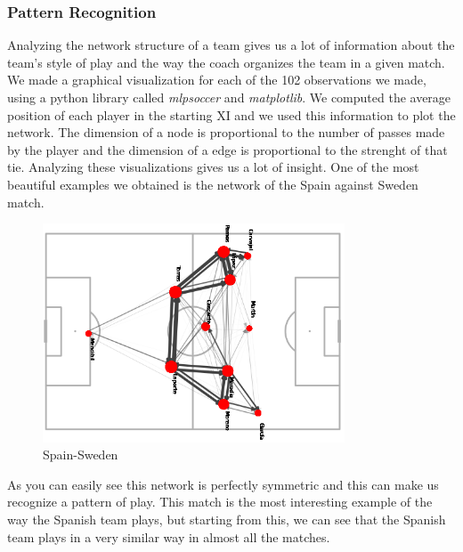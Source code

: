 \documentclass[12pt, a4paper]{article}
\begin{document}
\subsubsection{Pattern Recognition}
Analyzing the network structure of a team gives us a lot of information about the team's style of play and the way the coach organizes the team in a given match. We made a graphical visualization for each of the 102 observations we made, using a python library called \emph{mlpsoccer} and \emph{matplotlib}. We computed the average position of each player in the starting XI and we used this information to plot the network. The dimension of a node is proportional to the number of passes made by the player and the dimension of a edge is proportional to the strenght of that tie. Analyzing these visualizations gives us a lot of insight. One of the most beautiful examples we obtained is the network of the Spain against Sweden match. \\
\begin{figure}[H]
        \centering
        \includegraphics[width=0.8\textwidth]{../NoSubs/ImagesToRedo/Spain_Network_Spain_Sweden.png}
        \caption{Spain-Sweden}
        \label{fig: spain_sweden}
\end{figure}
As you can easily see this network is perfectly symmetric and this can make us recognize a pattern of play. This match is the most interesting example of the way the Spanish team plays, but starting from this, we can see that the Spanish team plays in a very similar way in almost all the matches. \\
\end{document}
